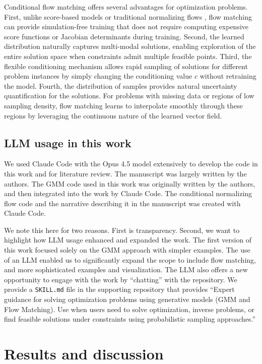 \documentclass{achemso}
\begin{document}
Conditional flow matching offers several advantages for optimization problems. First, unlike score-based models \cite{song2020score} or traditional normalizing flows \cite{papamakarios2021normalizing}, flow matching can provide simulation-free training that does not require computing expensive score functions or Jacobian determinants during training. Second, the learned distribution naturally captures multi-modal solutions, enabling exploration of the entire solution space when constraints admit multiple feasible points. Third, the flexible conditioning mechanism allows rapid sampling of solutions for different problem instances by simply changing the conditioning value \(c\) without retraining the model. Fourth, the distribution of samples provides natural uncertainty quantification for the solutions. For problems with missing data or regions of low sampling density, flow matching learns to interpolate smoothly through these regions by leveraging the continuous nature of the learned vector field.

\subsection{LLM usage in this work}
\label{sec:llm-usage}

We used Claude Code with the Opus 4.5 model extensively to develop the code in this work and for literature review. The manuscript was largely written by the authors.  The GMM code used in this work was originally written by the authors, and then integrated into the work by Claude Code. The conditional normalizing flow code and the narrative describing it in the manuscript was created with Claude Code.

We note this here for two reasons. First is transparency. Second, we want to highlight how LLM usage enhanced and expanded the work. The first version of this work focused solely on the GMM approach with simpler examples. The use of an LLM enabled us to significantly expand the scope to include flow matching, and more sophisticated examples and visualization. The LLM also offers a new opportunity to engage with the work by ``chatting'' with the repository. We provide a \texttt{SKILL.md} file in the supporting repository that provides ``Expert guidance for solving optimization problems using generative models (GMM and Flow Matching). Use when users need to solve optimization, inverse problems, or find feasible solutions under constraints using probabilistic sampling approaches.''

\section{Results and discussion} \label{sec:results}
\end{document}
